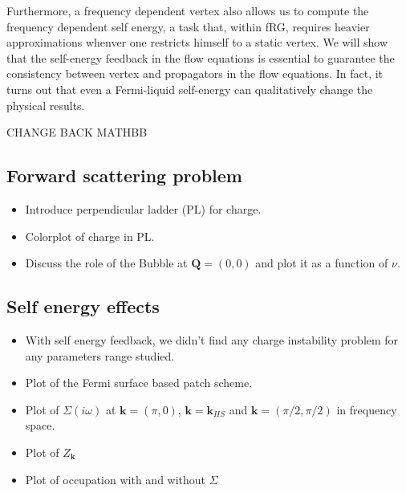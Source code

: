Furthermore, a frequency dependent vertex also allows us to compute the frequency dependent self energy, a task that, within fRG, requires heavier approximations whenver one restricts himself to a static vertex.  
We will show that the self-energy feedback in the flow equations is essential to guarantee the consistency between vertex and propagators in the flow equations.
In fact, it turns out that even a Fermi-liquid self-energy can qualitatively change the physical results. 


CHANGE BACK MATHBB
   
\subsection{Forward scattering problem}

\begin{itemize}

\item Introduce perpendicular ladder (PL) for charge.

\item Colorplot of charge in PL.

\item Discuss the role of the Bubble at $\boldsymbol{Q}=(0,0)$ and plot it as a function of $\nu$.

\end{itemize}

\subsection{Self energy effects}

\begin{itemize}

\item With self energy feedback, we didn't find any charge instability problem for any parameters range studied.

\item Plot of the Fermi surface based patch scheme.

\item Plot of $\Sigma(i\omega)$ at $\boldsymbol{k}=(\pi,0)$, $\boldsymbol{k}=\boldsymbol{k}_{HS}$ and $\boldsymbol{k}=(\pi/2,\pi/2)$ in frequency space.

\item Plot of $Z_{\boldsymbol{k}}$

\item Plot of occupation with and without $\Sigma$

\end{itemize}